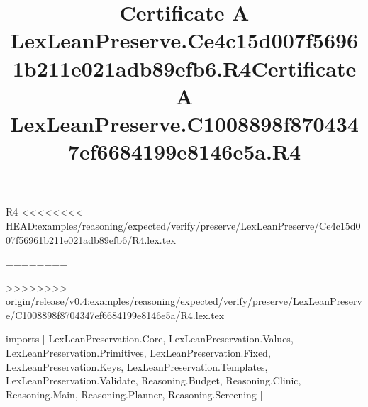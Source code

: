 \begin{lexlean}{R4}
<<<<<<<< HEAD:examples/reasoning/expected/verify/preserve/LexLeanPreserve/Ce4c15d007f56961b211e021adb89efb6/R4.lex.tex
\title{Certificate A LexLeanPreserve.Ce4c15d007f56961b211e021adb89efb6.R4}
========
\title{Certificate A LexLeanPreserve.C1008898f8704347ef6684199e8146e5a.R4}
>>>>>>>> origin/release/v0.4:examples/reasoning/expected/verify/preserve/LexLeanPreserve/C1008898f8704347ef6684199e8146e5a/R4.lex.tex
\begin{coremodule}
imports [
  LexLeanPreservation.Core,
  LexLeanPreservation.Values,
  LexLeanPreservation.Primitives,
  LexLeanPreservation.Fixed,
  LexLeanPreservation.Keys,
  LexLeanPreservation.Templates,
  LexLeanPreservation.Validate,
  Reasoning.Budget,
  Reasoning.Clinic,
  Reasoning.Main,
  Reasoning.Planner,
  Reasoning.Screening
]


\end{coremodule}
\end{lexlean}
